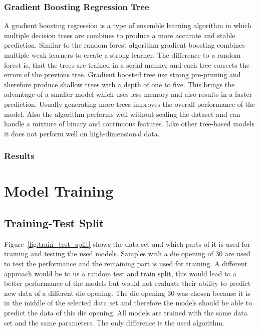 \subsubsection{Gradient Boosting Regression Tree}
A gradient boosting regression is a type of ensemble learning algorithm in which multiple
decision trees are combines
to produce a more accurate and stable prediction. Similar to the random forest algorithm gradient
boosting combines
multiple weak learners to create a strong learner.
The difference to a random forest is, that the trees are trained in a serial manner and each tree
corrects the errors
of the previous tree. \cite[p. 88-89]{muller_introductionmachinelearning_2016}
Gradient boosted tree use strong pre-pruning and therefore produce shallow trees with a depth of
one to five. This
brings the advantage of a smaller model which uses less memory and also results in a faster
prediction.
Usually generating more trees improves the overall performance of the model. \cite[p.
88-89]{muller_introductionmachinelearning_2016}
Also the algorithm performs well without scaling the dataset and can handle a mixture of binary
and continuous
features. \cite[p. 88-89]{muller_introductionmachinelearning_2016}
Like other tree-based models it does not perform well on high-dimensional data.

\subsubsection*{Results}

\label{sec:model-training}


\section{Model Training}

\subsection{Training-Test Split}
Figure~\ref{fig:train_test_split} shows the data set and which parts of it is used for training
and testing the used
models. Samples with a die opening of 30 are used to test the performance and the remaining part
is used for training.
A different approach would be to us a random test and train split, this would lead to a better
performance of the
models but would not evaluate their ability to predict new data of a different die opening.
The die opening 30 was chosen because it is in the middle of the selected data set and therefore
the models should be
able to predict the data of this die opening.
All models are trained with the same data set and the same parameters. The only difference is the
used algorithm.


